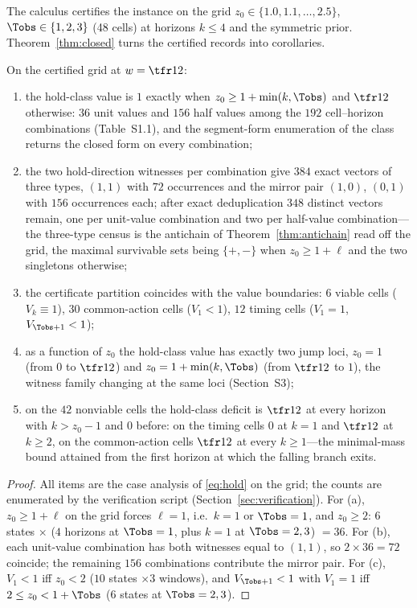 The calculus certifies the instance on the grid $z_0\in\{1.0,1.1,\dots,2.5\}$, $\Tobs\in\{1,2,3\}$ (48 cells) at horizons $k\le4$ and the symmetric prior. Theorem~\ref{thm:closed} turns the certified records into corollaries.

\begin{corollary}\label{cor:grid}
On the certified grid at $w=\tfr12$:
\begin{enumerate}[leftmargin=1.6em,itemsep=1pt]
\item[(a)] the hold-class value is $1$ exactly when $z_0\ge1+\min(k,\Tobs)$ and $\tfr12$ otherwise: $36$ unit values and $156$ half values among the $192$ cell--horizon combinations (Table~S1.1), and the segment-form enumeration of the class returns the closed form on every combination;
\item[(b)] the two hold-direction witnesses per combination give $384$ exact vectors of three types, $(1,1)$ with $72$ occurrences and the mirror pair $(1,0)$, $(0,1)$ with $156$ occurrences each; after exact deduplication $348$ distinct vectors remain, one per unit-value combination and two per half-value combination---the three-type census is the antichain of Theorem~\ref{thm:antichain} read off the grid, the maximal survivable sets being $\{+,-\}$ when $z_0\ge1+\ell$ and the two singletons otherwise;
\item[(c)] the certificate partition coincides with the value boundaries: $6$ viable cells ($V_k\equiv1$), $30$ common-action cells ($V_1<1$), $12$ timing cells ($V_1=1$, $V_{\Tobs+1}<1$);
\item[(d)] as a function of $z_0$ the hold-class value has exactly two jump loci, $z_0=1$ (from $0$ to $\tfr12$) and $z_0=1+\min(k,\Tobs)$ (from $\tfr12$ to $1$), the witness family changing at the same loci (Section~S3);
\item[(e)] on the $42$ nonviable cells the hold-class deficit is $\tfr12$ at every horizon with $k>z_0-1$ and $0$ before: on the timing cells $0$ at $k=1$ and $\tfr12$ at $k\ge2$, on the common-action cells $\tfr12$ at every $k\ge1$---the minimal-mass bound attained from the first horizon at which the falling branch exits.
\end{enumerate}
\end{corollary}

\begin{proof}
All items are the case analysis of \eqref{eq:hold} on the grid; the counts are enumerated by the verification script (Section~\ref{sec:verification}). For (a), $z_0\ge1+\ell$ on the grid forces $\ell=1$, i.e.\ $k=1$ or $\Tobs=1$, and $z_0\ge2$: $6$ states $\times$ ($4$ horizons at $\Tobs=1$, plus $k=1$ at $\Tobs=2,3$) $=36$. For (b), each unit-value combination has both witnesses equal to $(1,1)$, so $2\times36=72$ coincide; the remaining $156$ combinations contribute the mirror pair. For (c), $V_1<1$ iff $z_0<2$ ($10$ states $\times3$ windows), and $V_{\Tobs+1}<1$ with $V_1=1$ iff $2\le z_0<1+\Tobs$ ($6$ states at $\Tobs=2,3$).
\end{proof}
